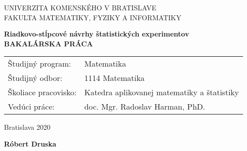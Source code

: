 \newpage
\thispagestyle{empty}
\begin{center}
{\large UNIVERZITA KOMENSKÉHO V BRATISLAVE \\
FAKULTA MATEMATIKY, FYZIKY A INFORMATIKY}
\end{center}


\vspace{5cm}
\begin{center}
{\large \bf Riadkovo-stĺpcové návrhy štatistických experimentov \\
\vspace{3cm}
BAKALÁRSKA PRÁCA}
\end{center}

\vfill
\begin{flushleft}
\begin{tabular}{ll}
Študijný program: & Matematika \\
Študijný odbor: & 1114 Matematika \\
Školiace pracovisko: & Katedra aplikovanej matematiky a štatistiky \\
Vedúci práce: & doc. Mgr. Radoslav Harman, PhD. \\
\end{tabular}
\end{flushleft}

\vfill
%
\begin{multicols}{2}
\begin{flushleft} Bratislava 2020 \end{flushleft}
\begin{flushright} {\bf Róbert Druska} \end{flushright}
\end{multicols}

